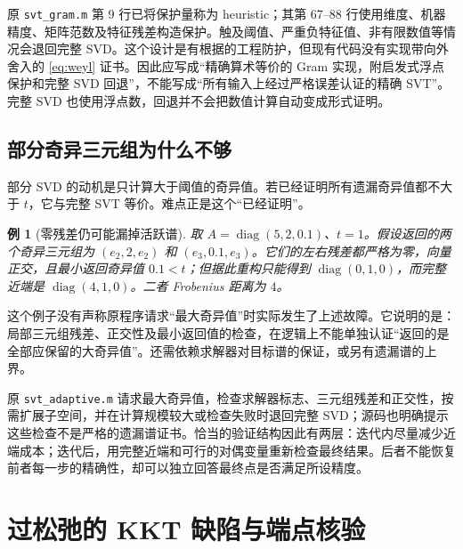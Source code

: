 \documentclass[UTF8,fontset=none,zihao=-4,a4paper]{ctexart}
\theoremstyle{plainzh}
\newtheorem{example}[proposition]{例}
\newcommand{\diag}{\operatorname{diag}}
\numberwithin{equation}{section}
\begin{document}
原 \texttt{svt\_gram.m} 第 9 行已将保护量称为 heuristic；其第 67--88 行使用维度、机器精度、矩阵范数及特征残差构造保护。触及阈值、严重负特征值、非有限数值等情况会退回完整 SVD。这个设计是有根据的工程防护，但现有代码没有实现带向外舍入的 \eqref{eq:weyl} 证书。因此应写成“精确算术等价的 Gram 实现，附启发式浮点保护和完整 SVD 回退”，不能写成“所有输入上经过严格误差认证的精确 SVT”。完整 SVD 也使用浮点数，回退并不会把数值计算自动变成形式证明。

\subsection{部分奇异三元组为什么不够}
部分 SVD 的动机是只计算大于阈值的奇异值。若已经证明所有遗漏奇异值都不大于 $t$，它与完整 SVT 等价。难点正是这个“已经证明”。
\begin{example}[零残差仍可能漏掉活跃谱]\label{ex:partial}
取 $A=\diag(5,2,0.1)$、$t=1$。假设返回的两个奇异三元组为 $(e_2,2,e_2)$ 和 $(e_3,0.1,e_3)$。它们的左右残差都严格为零，向量正交，且最小返回奇异值 $0.1<t$；但据此重构只能得到 $\diag(0,1,0)$，而完整近端是 $\diag(4,1,0)$。二者 Frobenius 距离为 $4$。
\end{example}
这个例子没有声称原程序请求“最大奇异值”时实际发生了上述故障。它说明的是：局部三元组残差、正交性及最小返回值的检查，在逻辑上不能单独认证“返回的是全部应保留的大奇异值”。还需依赖求解器对目标谱的保证，或另有遗漏谱的上界。

原 \texttt{svt\_adaptive.m} 请求最大奇异值，检查求解器标志、三元组残差和正交性，按需扩展子空间，并在计算规模较大或检查失败时退回完整 SVD；源码也明确提示这些检查不是严格的遗漏谱证书。恰当的验证结构因此有两层：迭代内尽量减少近端成本；迭代后，用完整近端和可行的对偶变量重新检查最终结果。后者不能恢复前者每一步的精确性，却可以独立回答最终点是否满足所设精度。

\section{过松弛的 KKT 缺陷与端点核验}
\end{document}
